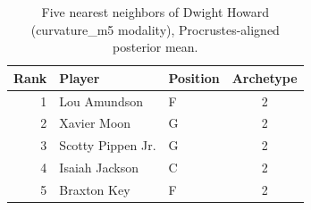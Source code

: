 \begin{table}[htbp]
  \centering\small
  \begin{tabular}{rllc}
    \toprule
    Rank & Player & Position & Archetype \\
    \midrule
    1 & Lou Amundson & F & 2 \\
    2 & Xavier Moon & G & 2 \\
    3 & Scotty Pippen Jr. & G & 2 \\
    4 & Isaiah Jackson & C & 2 \\
    5 & Braxton Key & F & 2 \\
    \bottomrule
  \end{tabular}
  \caption{Five nearest neighbors of Dwight Howard (curvature_m5 modality), Procrustes-aligned posterior mean.}
  \label{tab:Dwight_Howard_neighbors_curvature_m5}
\end{table}

